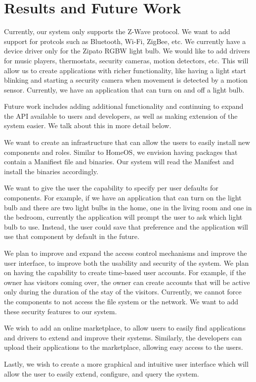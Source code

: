 \section{Results and Future Work}
\label{sec:future}
Currently, our system only supports the Z-Wave protocol. We want
to add support for protcols such as Bluetooth, Wi-Fi, ZigBee, etc. We currently
have a device driver only for the Zipato RGBW light bulb. We would like to add
drivers for music players, thermostats, security cameras, motion detectors, etc.
This will allow us to create applications with richer functionality, like having
a light start blinking and starting a security camera when movement is detected
by a motion sensor. Currently, we have an application that can turn on and off a
light bulb.

Future work includes adding additional functionality and continuing to expand
the API available to users and developers, as well as making extension of the
system easier. We talk about this in more detail below.

We want to create an infrastructure that can allow the users to easily install
new components and roles. Similar to HomeOS, we envision having packages that
contain a Manifiest file and binaries. Our system will read the Manifest and
install the binaries accordingly.

We want to give the user the capability to specify per user defaults for
components. For example, if we have an application that can turn on the light
bulb and there are two light bulbs in the home, one in the living room and one
in the bedroom, currently the application will prompt the user to ask which
light bulb to use. Instead, the user could save that preference and the
application will use that component by default in the future.

We plan to improve and expand the access control mechanisms and improve the user
interface, to improve both the usability and security of the system. We plan on
having the capability to create time-based user accounts. For example, if the
owner has visitors coming over, the owner can create accounts that will be
active only during the duration of the stay of the visitors. Currently, we
cannot force the components to not access the file system or the network. We
want to add these security features to our system.

We wish to add an online marketplace, to allow users to easily find applications
and drivers to extend and improve their systems. Similarly, the developers can
upload their applications to the marketplace, allowing easy access to the users.

Lastly, we wish to create a more graphical and intuitive user interface which
will allow the user to easily extend, configure, and query the system.
